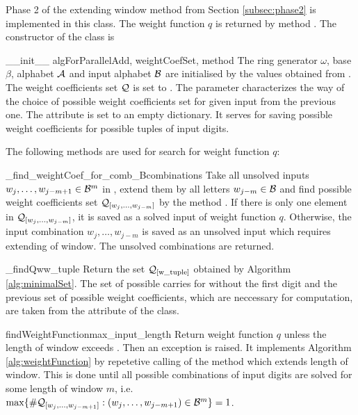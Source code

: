 Phase 2 of the extending window method from Section \ref{subsec:phase2} is implemented in this class. The weight function $q$ is returned by method . The constructor of the class is

\begin{method}{\_\_init\_\_}{ algForParallelAdd, weightCoefSet, method}
The ring generator $\omega$, base $\beta$, alphabet $\mathcal{A}$ and input alphabet $\mathcal{B}$ are initialised by the values obtained from . The weight coefficients set $\mathcal{Q}$ is set to . The parameter  characterizes the way of the choice of possible weight coefficients set for given input from the previous one. The attribute  is set to an empty dictionary. It serves for saving possible weight coefficients for possible tuples of input digits.
\end{method}

The following methods are used for search for weight function $q$:

\begin{method}{\_find\_weightCoef\_for\_comb\_B}{combinations}
Take all unsolved inputs $w_j,\dots, w_{j-m+1} \in \mathcal{B}^m$ in , extend them by all letters $w_{j-m}\in\mathcal{B}$ and find possible weight coefficients set $\mathcal{Q}_{[w_j,\dots, w_{j-m}]}$ by the method . If there is only one element in $\mathcal{Q}_{[w_j,\dots, w_{j-m}]}$, it is saved as a solved input of weight function $q$. Otherwise, the input combination $w_j,\dots, w_{j-m}$ is saved as an unsolved input which requires extending of window. The unsolved combinations are returned.  
\end{method}


\begin{method}{\_findQw}{w\_tuple}
Return the set $\mathcal{Q}_{[\text{w\_tuple}]}$ obtained by Algorithm \ref{alg:minimalSet}. The set of possible carries for  without the first digit and the previous set of possible weight coefficients, which are neccessary for computation, are taken from the attribute  of the class.
\end{method}


\begin{method}{findWeightFunction}{max\_input\_length}
Return weight function $q$ unless the length of window exceeds . Then an exception is raised. It implements Algorithm \ref{alg:weightFunction} by repetetive calling of the method  which extends length of window. This is done until all possible combinations of input digits are solved for some length of window $m$, i.e. $\max\{\#\mathcal{Q}_{[w_j,\dots, w_{j-m+1}]}:(w_j,\dots, w_{j-m+1}) \in \mathcal{B}^m \} = 1$.
\end{method}


